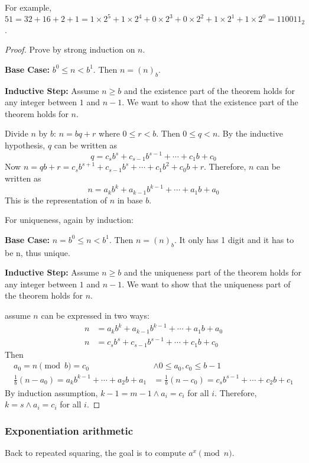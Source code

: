 \documentclass[letterpaper,12pt,oneside]{article}
\begin{document}
For example, $51=32+16+2+1=1\times 2^5+1\times 2^4+0\times 2^3+0\times
    2^2+1\times 2^1+1\times 2^0=110011_2$.

\begin{proof}
    Prove by strong induction on $n$.

    \textbf{Base Case:} $b^0\le n<b^1$. Then $n=(n)_b$.

    \textbf{Inductive Step:} Assume $n\ge b$ and the existence part of the theorem holds for any integer between $1$ and $n-1$. We want to show that the existence part of the theorem holds for $n$.

    Divide $n$ by $b$: $n=bq+r$ where $0\le r<b$. Then $0\le q<n$. By the inductive
    hypothesis, $q$ can be written as \[
        q=c_s b^s+c_{s-1}b^{s-1}+\cdots+c_1b+c_0
    \]
    Now $n=qb+r=c_s b^{s+1}+c_{s-1}b^s+\cdots+c_1b^2+c_0b+r$. Therefore, $n$ can be
    written as \[
        n=a_k b^k+a_{k-1}b^{k-1}+\cdots+a_1b+a_0
    \]
    This is the representation of $n$ in base $b$.

    For uniqueness, again by induction:

    \textbf{Base Case:} $n=b^0\le n<b^1$. Then $n=(n)_b$. It only has 1 digit and it has to be n, thus unique.

    \textbf{Inductive Step:} Assume $n\ge b$ and the uniqueness part of the theorem holds for any integer between $1$ and $n-1$. We want to show that the uniqueness part of the theorem holds for $n$.

    assume $n$ can be expressed in two ways: \begin{align*}
        n & = a_k b^k+a_{k-1}b^{k-1}+\cdots+a_1b+a_0 \\
        n & = c_s b^s+c_{s-1}b^{s-1}+\cdots+c_1b+c_0
    \end{align*}
    Then \begin{align*}
        a_0 = n \pmod b = c_0                           & \land  0\le a_0, c_0 \le b-1                      \\
        \frac{1}{b}(n-a_0)=a_k b^{k-1}+\cdots+a_2 b+a_1 & = \frac{1}{b}(n-c_0)=c_s b^{s-1}+\cdots+c_2 b+c_1
    \end{align*}
    By induction assumption, $k-1=m-1 \land a_i=c_i$ for all $i$. Therefore, $k=s \land a_i=c_i$ for all $i$.
\end{proof}
\subsubsection{Exponentiation arithmetic}
Back to repeated squaring, the goal is to compute $a^x \pmod n$.
\end{document}
